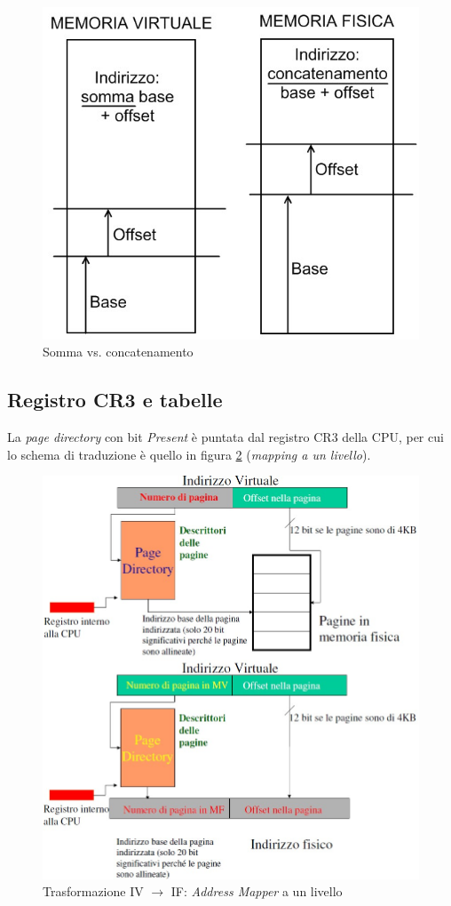 \begin{figure}[!h]
\centering
\includegraphics[width=0.45\columnwidth]{img/sommaVSconcatenamento}
\caption{Somma vs. concatenamento}
\label{fig:sommaVSconcatenamento}
\end{figure}

\clearpage

\subsection{Registro CR3 e tabelle}
\label{sec:CR3}

La \textit{page directory} con bit \textit{Present} è puntata dal registro CR3 della CPU, per cui lo schema di traduzione è quello in figura \ref{fig:belvaCR3} (\textit{mapping a un livello}).

\begin{figure}[!h]
\centering
\includegraphics[width=0.86\columnwidth]{img/belvaCR3}
\caption{Trasformazione IV $\to$ IF: \textit{Address Mapper} a un livello}
\label{fig:belvaCR3}
\end{figure}

